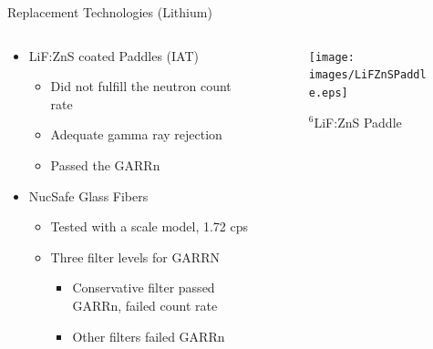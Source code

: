 \begin{frame}{Replacement Technologies (Lithium)}
\begin{columns}[onlytextwidth]
\begin{column}{0.45\textwidth}
\begin{itemize}
	\small
	\item LiF:ZnS coated Paddles (IAT) \cite{kouzes_lithium_2010}
	\begin{itemize}
		\tiny
		\item Did not fulfill the neutron count rate
		\item Adequate gamma ray rejection
		\item Passed the GARRn
	\end{itemize}
	\small
	\item NucSafe Glass Fibers\cite{kouzes_alternative_2010}
	\begin{itemize}
		\tiny
		\item Tested with a scale model, 1.72 cps
		\item Three filter levels for GARRN
		\begin{itemize}
			\tiny
			\item Conservative filter passed GARRn, failed count rate
			\item Other filters failed GARRn
		\end{itemize}
	\end{itemize}
\end{itemize}
\end{column}
\begin{column}{0.45\textwidth}
	\begin{figure}
		\texttt{[image: images/LiFZnSPaddle.eps]}
		\caption{${}^6$LiF:ZnS Paddle}
		\label{fig:LifZnSPaddle}

\end{figure}
\end{column}
\end{columns}
\end{frame}
